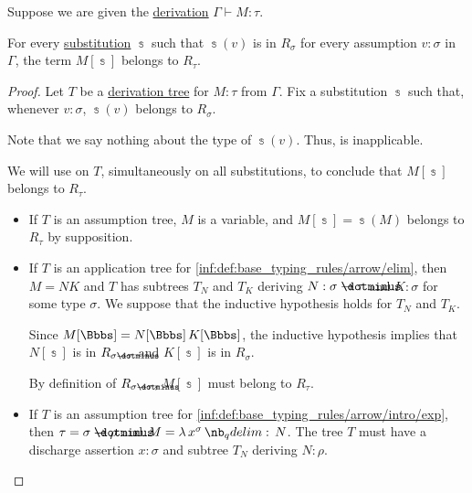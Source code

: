 \begin{lemma}\label{thm:reducibility_candidate_substitution}
  Suppose we are given the \hyperref[def:simple_type_derivability]{derivation} \( \Gamma \vdash M: \tau \).

  For every \hyperref[def:lambda_substitution]{substitution} \( \Bbbs \) such that \( \Bbbs(v) \) is in \( R_\sigma \) for every assumption \( v: \sigma \) in \( \Gamma \), the term \( M[\Bbbs] \) belongs to \( R_\tau \).
\end{lemma}
\begin{proof}
  Let \( T \) be a \hyperref[def:type_derivation_tree]{derivation tree} for \( M: \tau \) from \( \Gamma \). Fix a substitution \( \Bbbs \) such that, whenever \( v: \sigma \), \( \Bbbs(v) \) belongs to \( R_\sigma \).

  Note that we say nothing about the type of \( \Bbbs(v) \). Thus,  is inapplicable.

  We will use  on \( T \), simultaneously on all substitutions, to conclude that \( M[\Bbbs] \) belongs to \( R_\tau \).
  \begin{itemize}
    \item If \( T \) is an assumption tree, \( M \) is a variable, and \( M[\Bbbs] = \Bbbs(M) \) belongs to \( R_\tau \) by supposition.

    \item If \( T \) is an application tree for \ref{inf:def:base_typing_rules/arrow/elim}, then \( M = NK \) and \( T \) has subtrees \( T_N \) and \( T_K \) deriving \( N: \sigma \synimplies \tau \) and \( K: \sigma \) for some type \( \sigma \). We suppose that the inductive hypothesis holds for \( T_N \) and \( T_K \).

    Since \( M[\Bbbs] = N[\Bbbs] \thinspace K[\Bbbs] \), the inductive hypothesis implies that \( N[\Bbbs] \) is in \( R_{\sigma \synimplies \tau} \) and \( K[\Bbbs] \) is in \( R_\sigma \).

    By definition of \( R_{\sigma \synimplies \tau} \), \( M[\Bbbs] \) must belong to \( R_\tau \).

    \item If \( T \) is an assumption tree for \ref{inf:def:base_typing_rules/arrow/intro/exp}, then \( \tau = \sigma \synimplies \rho \) and \( M = \qabs {x^\sigma} N \). The tree \( T \) must have a discharge assertion \( x: \sigma \) and subtree \( T_N \) deriving \( N: \rho \).


\end{itemize}
\end{proof}

